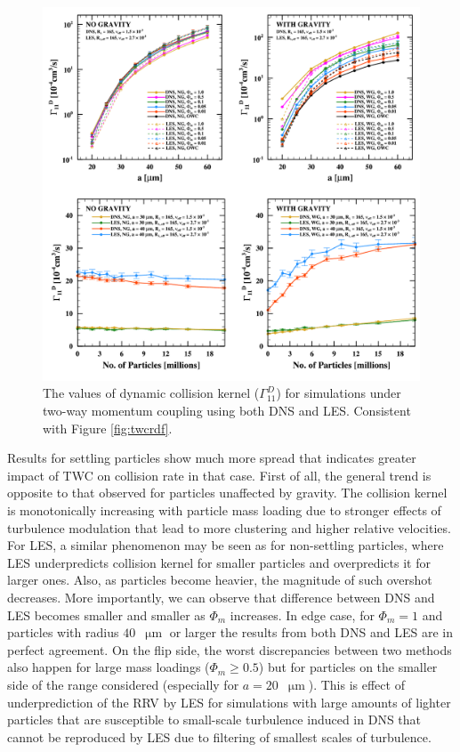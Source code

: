 \documentclass{pracamgren}
\begin{document}
\begin{figure}[h]
\centering
\includegraphics[width=13.5cm]{figures/2-12_twcgamma.pdf}
\caption{
The values of dynamic collision kernel ($\Gamma_{11}^D$) for simulations under two-way momentum coupling using both DNS and LES.
Consistent with Figure \ref{fig:twcrdf}.
}
\label{fig:twcgamma}
\end{figure}

Results for settling particles show much more spread that indicates greater impact of TWC on collision rate in that case.
First of all, the general trend is opposite to that observed for particles unaffected by gravity.
The collision kernel is monotonically increasing with particle mass loading due to stronger effects of turbulence modulation that lead to more clustering and higher relative velocities.
For LES, a similar phenomenon may be seen as for non-settling particles, where LES underpredicts collision kernel for smaller particles and overpredicts it for larger ones.
Also, as particles become heavier, the magnitude of such overshot decreases.
More importantly, we can observe that difference between DNS and LES becomes smaller and smaller as $\Phi_m$ increases.
In edge case, for $\Phi_m = 1$ and particles with radius $40$~$\upmu\text{m}$ or larger the results from both DNS and LES are in perfect agreement.
On the flip side, the worst discrepancies between two methods also happen for large mass loadings ($\Phi_m \ge 0.5$) but for particles on the smaller side of the range considered (especially for ${a = 20}$~$\upmu\text{m}$).
This is effect of underprediction of the RRV by LES for simulations with large amounts of lighter particles that are susceptible to small-scale turbulence induced in DNS that cannot be reproduced by LES due to filtering of smallest scales of turbulence.
\end{document}
